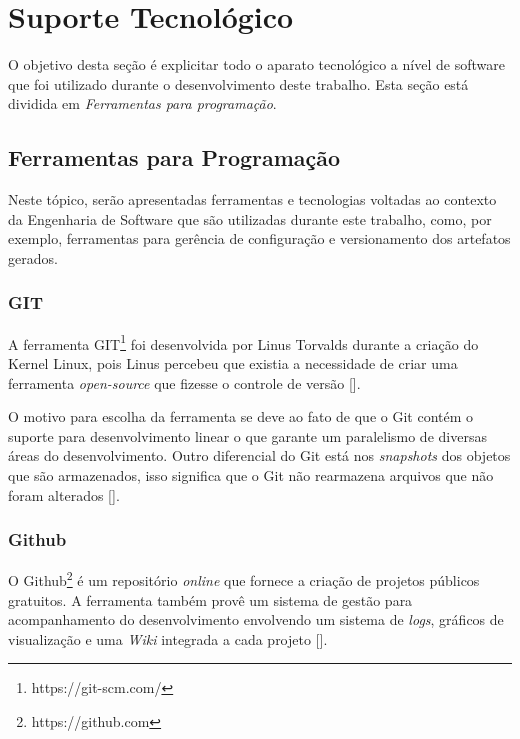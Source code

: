 
\chapter[Suporte Tecnológico]{Suporte Tecnológico}

O objetivo desta seção é explicitar todo o aparato tecnológico a nível de software que foi utilizado durante o desenvolvimento deste trabalho.  Esta seção está dividida em \textit{Ferramentas para programação}.

\section{Ferramentas para Programação} %
\label{sec:engenharia_de_software}
	Neste tópico, serão apresentadas ferramentas e tecnologias voltadas ao contexto da Engenharia de Software que são utilizadas durante este trabalho, como, por exemplo, ferramentas para gerência de configuração e versionamento dos artefatos gerados.

	\subsection{GIT} %
	\label{sub:git}
	
		A ferramenta GIT\footnote{https://git-scm.com/} foi desenvolvida por Linus Torvalds durante a criação do Kernel Linux, pois Linus percebeu que existia a necessidade de criar uma ferramenta \textit{open-source} que fizesse o controle de versão [\citep{bento_alise_2013}]. 
	
	\linebreak	O motivo para escolha da ferramenta se deve ao fato de que o Git contém o suporte para desenvolvimento linear o que garante um paralelismo de diversas áreas do desenvolvimento. Outro diferencial do Git está nos \textit{snapshots} dos objetos que são armazenados, isso significa que o Git não rearmazena arquivos que não foram alterados [\citep{martinho_git_2013}].

	\subsection{Github} %
	\label{sub:github}
		O Github\footnote{https://github.com} é um repositório \textit{online} que fornece a criação de projetos públicos gratuitos. A ferramenta também provê um sistema de gestão para acompanhamento do desenvolvimento envolvendo um sistema de \textit{logs}, gráficos de visualização e uma \textit{Wiki} integrada a cada projeto [\citep{martinho_git_2013}].
	
